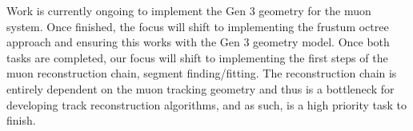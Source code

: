 Work is currently ongoing to implement the Gen 3 geometry for the muon system. Once finished, the focus will shift to implementing the frustum octree approach and ensuring this works with the Gen 3 geometry model. Once both tasks are completed, our focus will shift to implementing the first steps of the muon reconstruction chain, segment finding/fitting. The reconstruction chain is entirely dependent on the muon tracking geometry and thus is a bottleneck for developing track reconstruction algorithms, and as such, is a high priority task to finish. 
